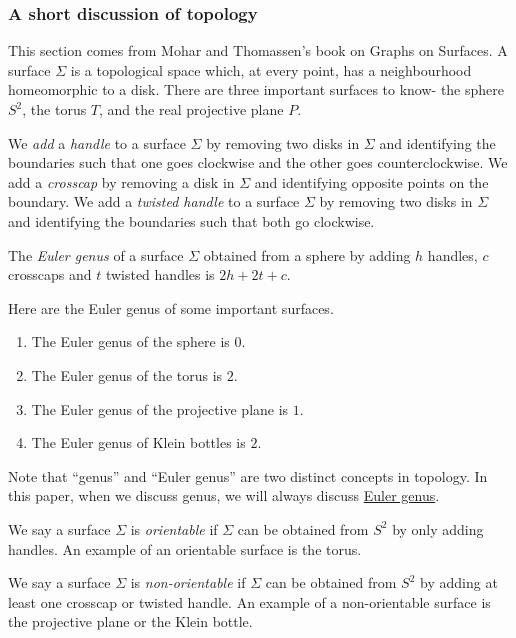 \subsubsection{A short discussion of topology}\label{sssec:topology}
This section comes from Mohar and Thomassen's book on Graphs on Surfaces. \cite{moharGraphsSurfaces2001} A surface \(\Sigma\) is a topological space which, at every point, has a neighbourhood homeomorphic to a disk. There are three important surfaces to know- the sphere \(S^2\), the torus \(T\), and the real projective plane \(P\).
\par
We \textit{add} a \textit{handle} to a surface \(\Sigma\) by removing two disks in \(\Sigma\) and identifying the boundaries such that one goes clockwise and the other goes counterclockwise. We add a \textit{crosscap} by removing a disk in \(\Sigma\) and identifying opposite points on the boundary. We add a \textit{twisted handle} to a surface \(\Sigma\) by removing two disks in \(\Sigma\) and identifying the boundaries such that both go clockwise.
\par
\begin{definition}
	The \textit{Euler genus} of a surface \(\Sigma\) obtained from a sphere by adding \(h\) handles, \(c\) crosscaps and \(t\) twisted handles is \(2h + 2t + c\).
\end{definition}

\begin{example}
	Here are the Euler genus of some important surfaces.
	\begin{enumerate}
		\item The Euler genus of the sphere is \(0\).
		\item The Euler genus of the torus is \(2\).
		\item The Euler genus of the projective plane is \(1\). 
		\item The Euler genus of Klein bottles is \(2\). 
	\end{enumerate}
\end{example}

Note that ``genus'' and ``Euler genus'' are two distinct concepts in topology. In this paper, when we discuss genus, we will always discuss \underline{Euler genus}.

We say a surface \(\Sigma\) is \textit{orientable} if \(\Sigma\) can be obtained from \(S^2\) by only adding handles. An example of an orientable surface is the torus.

We say a surface \(\Sigma\) is \textit{non-orientable} if \(\Sigma\) can be obtained from \(S^2\) by adding at least one crosscap or twisted handle. An example of a non-orientable surface is the projective plane or the Klein bottle. 

